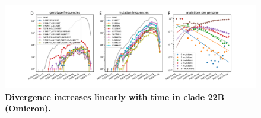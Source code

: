 \begin{figure}
    \includegraphics[width=\textwidth]{figures/counts/22B_counts.pdf}
    \caption{{\bf Divergence increases linearly with time in clade 22B (Omicron).}
    \label{fig:22B_counts}}
\end{figure}
